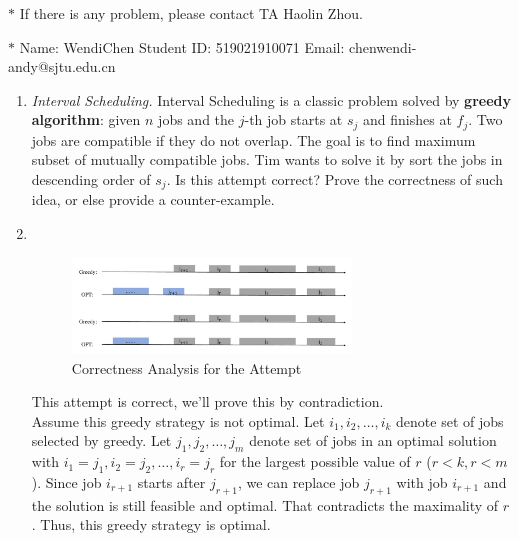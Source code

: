 \documentclass[12pt,a4paper]{article}
\makeatletter
\newtheorem*{solution}{Solution}
\theoremstyle{definition}
\renewenvironment{solution}[1][Solution] {\par\pushQED{\qed}\normalfont\topsep6\p@\@plus6\p@\relax\trivlist\item[\hskip\labelsep\bfseries#1\@addpunct{.}]\ignorespaces}{\popQED\endtrivlist\@endpefalse} \makeatother
\makeatother
\begin{document}
\noindent

\noindent{}


\begin{center}
\footnotesize{\color{red}$*$ If there is any problem, please contact TA Haolin Zhou.}\par
\footnotesize{\color{blue}$*$ Name: WendiChen  \quad Student ID: 519021910071 \quad Email: chenwendi-andy@sjtu.edu.cn}
\end{center}

\begin{enumerate}
	\item \textit{Interval Scheduling.} Interval Scheduling is a classic problem solved by \textbf{greedy algorithm}: given $n$ jobs and the $j$-th job starts at $s_j$ and finishes at $f_j$. Two jobs are compatible if they do not overlap. The goal is to find maximum subset of mutually compatible jobs. Tim wants to solve it by sort the jobs in descending order of $s_j$. Is this attempt correct? Prove the correctness of such idea, or else provide a counter-example.
	    \begin{solution}
	        ~\\
	        \begin{figure}[htbp]
                \centering
                \includegraphics[width=0.7\textwidth]{Fig-Interval_Scheduling.pdf}
                \caption{Correctness Analysis for the Attempt}\label{Fig-Interval-Scheduling}
            \end{figure}
            This attempt is correct, we'll prove this by contradiction.\\
            Assume this greedy strategy is not optimal. Let $i_1,i_2,\dots,i_k$ denote set of jobs selected by greedy. Let $j_1,j_2,\dots,j_m$ denote set of jobs in an optimal solution with $i_1=j_1,i_2=j_2,\dots,i_r=j_r$ for the largest possible value of $r$ ($r<k,r<m$). Since job $i_{r+1}$ starts after $j_{r+1}$, we can replace job $j_{r+1}$ with job $i_{r+1}$ and the solution is still feasible and optimal. That contradicts the maximality of $r$. Thus, this greedy strategy is optimal.
	    \end{solution}
	

\end{enumerate}
\end{document}
